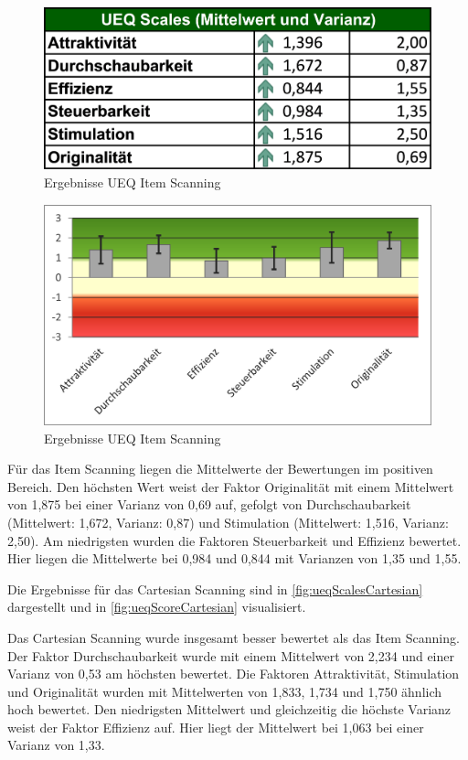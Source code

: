 \begin{figure}[tbh]
    \centering
   \includegraphics{images/Results/UEQ-Table-Means-Item.png}
    \caption{Ergebnisse UEQ Item Scanning}
    \label{fig:ueqScalesItem}
   \end{figure}

\begin{figure}[tbh]
    \centering
   \includegraphics{images/Results/UEQ-Item.png}
    \caption{Ergebnisse UEQ Item Scanning}
    \label{fig:ueqScoreItem}
   \end{figure}


Für das Item Scanning liegen die Mittelwerte der Bewertungen im positiven Bereich. Den höchsten Wert weist der Faktor Originalität mit einem Mittelwert von 1,875 bei einer Varianz von 0,69 auf, gefolgt von Durchschaubarkeit (Mittelwert: 1,672, Varianz: 0,87) und Stimulation (Mittelwert: 1,516, Varianz: 2,50). Am niedrigsten wurden die Faktoren Steuerbarkeit und Effizienz bewertet. Hier liegen die Mittelwerte bei 0,984 und 0,844 mit Varianzen von 1,35 und 1,55. 

Die Ergebnisse für das Cartesian Scanning sind in \autoref{fig:ueqScalesCartesian} dargestellt und in \autoref{fig:ueqScoreCartesian} visualisiert. 

Das Cartesian Scanning wurde insgesamt besser bewertet als das Item Scanning. Der Faktor Durchschaubarkeit wurde mit einem Mittelwert von 2,234 und einer Varianz von 0,53 am höchsten bewertet. Die Faktoren Attraktivität, Stimulation und Originalität wurden mit Mittelwerten von 1,833, 1,734 und 1,750 ähnlich hoch bewertet. Den niedrigsten Mittelwert und gleichzeitig die höchste Varianz weist der Faktor Effizienz auf. Hier liegt der Mittelwert bei 1,063 bei einer Varianz von 1,33. 

